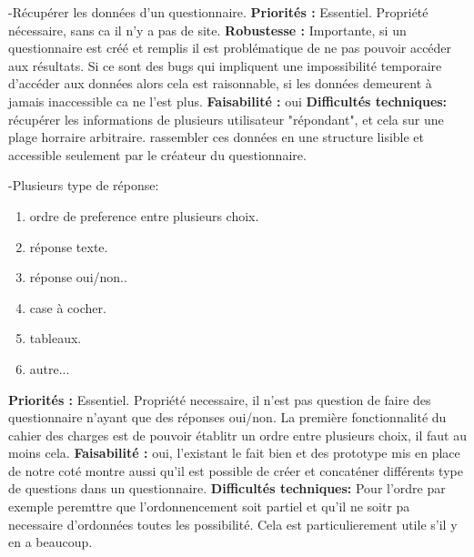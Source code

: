 \documentclass{article}
\begin{document}
-Récupérer les données d'un questionnaire.\newline
\textbf{Priorités : }Essentiel. Propriété nécessaire, sans ca il n'y a pas de site. \newline
\textbf{Robustesse : }Importante, si un questionnaire est créé et remplis il est problématique de ne pas pouvoir accéder aux résultats. Si ce sont des bugs qui impliquent une impossibilité temporaire d'accéder aux données alors cela est raisonnable, si les données demeurent à jamais inaccessible ca ne l'est plus.\newline
\textbf{Faisabilité : }oui\newline
\textbf{Difficultés techniques: }récupérer les informations de plusieurs utilisateur "répondant", et cela sur une plage horraire arbitraire. rassembler ces données en une structure lisible et accessible seulement par le créateur du questionnaire.  \newline

-Plusieurs type de réponse:\newline
\begin{enumerate}
    \item ordre de preference entre plusieurs choix.
    \item réponse texte.
    \item réponse oui/non..
    \item case à cocher.
    \item tableaux.
    \item autre...
\end{enumerate}
\textbf{Priorités : }Essentiel. Propriété necessaire, il n'est pas question de faire des questionnaire n'ayant que des réponses oui/non. La première fonctionnalité du cahier des charges est de pouvoir établitr un ordre entre plusieurs choix, il faut au moins cela. \newline
\textbf{Faisabilité : }oui, l'existant le fait bien et des prototype mis en place de notre coté montre aussi qu'il est possible de créer et concaténer différents type de questions dans un questionnaire.\newline
\textbf{Difficultés techniques: }Pour l'ordre par exemple peremttre que l'ordonnencement soit partiel et qu'il ne soitr pa necessaire d'ordonnées toutes les possibilité. Cela est particulierement utile s'il y en a beaucoup.\newline
\end{document}
